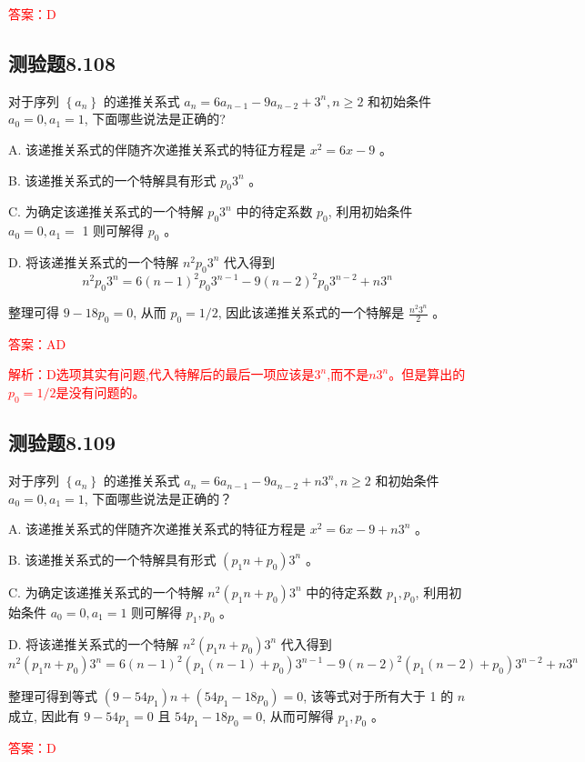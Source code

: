\documentclass[UTF8, heading=true]{ctexart}
\begin{document}
\textcolor{red}{答案：D}

\subsection{测验题8.108}

对于序列 $\left\{a_n\right\}$ 的递推关系式 $a_n=6 a_{n-1}-9 a_{n-2}+3^n, n \geq 2$ 和初始条件 $a_0=0, a_1=1$, 下面哪些说法是正确的?

A. 该递推关系式的伴随齐次递推关系式的特征方程是 $x^2=6 x-9$ 。

B. 该递推关系式的一个特解具有形式 $p_0 3^n$ 。

C. 为确定该递推关系式的一个特解 $p_0 3^n$ 中的待定系数 $p_0$, 利用初始条件 $a_0=0, a_1=$ 1 则可解得 $p_0$ 。

D. 将该递推关系式的一个特解 $n^2 p_0 3^n$ 代入得到
$$
n^2 p_0 3^n=6(n-1)^2 p_0 3^{n-1}-9(n-2)^2 p_0 3^{n-2}+n 3^n
$$

整理可得 $9-18 p_0=0$, 从而 $p_0=1 / 2$, 因此该递推关系式的一个特解是 $\frac{n^2 3^n}{2}$ 。

\textcolor{red}{答案：AD}

\textcolor{red}{解析：D选项其实有问题,代入特解后的最后一项应该是$3^n$,而不是$n3^n$。但是算出的$p_0=1/2$是没有问题的。}


\subsection{测验题8.109}

对于序列 $\left\{a_n\right\}$ 的递推关系式 $a_n=6 a_{n-1}-9 a_{n-2}+n 3^n, n \geq 2$ 和初始条件 $a_0=0, a_1=1$, 下面哪些说法是正确的？

A. 该递推关系式的伴随齐次递推关系式的特征方程是 $x^2=6 x-9+n 3^n$ 。

B. 该递推关系式的一个特解具有形式 $\left(p_1 n+p_0\right) 3^n$ 。

C. 为确定该递推关系式的一个特解 $n^2\left(p_1 n+p_0\right) 3^n$ 中的待定系数 $p_1, p_0$, 利用初始条件 $a_0=0, a_1=1$ 则可解得 $p_1, p_0$ 。

D. 将该递推关系式的一个特解 $n^2\left(p_1 n+p_0\right) 3^n$ 代入得到
$$
n^2\left(p_1 n+p_0\right) 3^n=6(n-1)^2\left(p_1(n-1)+p_0\right) 3^{n-1}-9(n-2)^2\left(p_1(n-2)+p_0\right) 3^{n-2}+n 3^n
$$

整理可得到等式 $\left(9-54 p_1\right) n+\left(54 p_1-18 p_0\right)=0$, 该等式对于所有大于 1 的 $n$ 成立, 因此有 $9-54 p_1=0$ 且 $54 p_1-18 p_0=0$, 从而可解得 $p_1, p_0$ 。


\textcolor{red}{答案：D}
\end{document}

